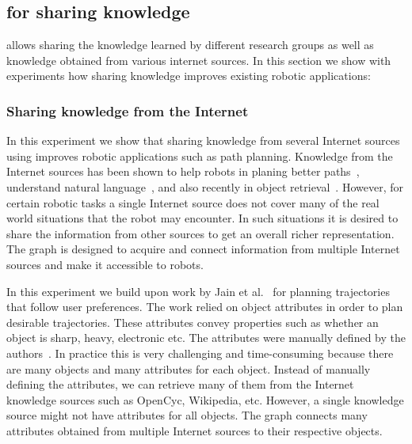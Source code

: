 

\subsection{\robobrain{} for sharing knowledge}
\robobrain{} allows sharing the knowledge learned by different research groups as well as knowledge obtained from various internet sources. In this section we show with experiments how sharing knowledge improves existing robotic applications:


\subsubsection{Sharing knowledge from the Internet}
In this experiment we show that sharing knowledge from several Internet sources using \robobrain{} improves robotic applications such as path planning.  Knowledge from the Internet sources has been shown to help robots in planing better paths~\citep{beetzIcra2010}, understand natural language~\citep{coyneCosli,tellex2011understanding}, and also recently in object retrieval~\citep{guadarramaRss2014}. However, for certain robotic tasks a single Internet source does not cover many of the real world situations that the robot may encounter. In such situations it is desired to share the information from other sources to get an overall richer representation.
The \robobrain{} graph is designed to acquire and connect information from multiple Internet sources and make it accessible to robots.

In this experiment we build upon work by Jain et al.~\citep{jainsaxena2013_trajectorypreferences} for planning trajectories that follow user preferences. The work relied on object attributes in order to plan desirable trajectories. These attributes convey properties such as whether an object is sharp, heavy, electronic etc. The attributes were manually defined by the authors~\citep{jainsaxena2013_trajectorypreferences}. In practice this is very challenging and time-consuming because there are many objects and many attributes for each object.
Instead of manually defining the attributes, we can retrieve many of them from the Internet knowledge
sources such as OpenCyc, Wikipedia, etc. However, a single knowledge source might not have
attributes for all objects.
The \robobrain{} graph connects many attributes obtained from multiple Internet sources to their respective objects.


